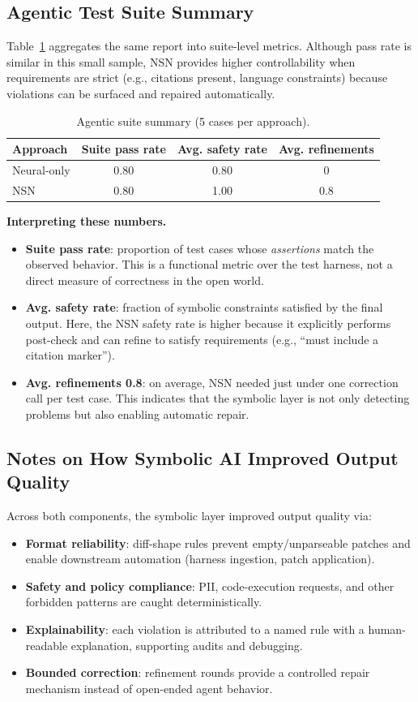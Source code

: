 \documentclass[conference]{IEEEtran}
\begin{document}
\subsection{Agentic Test Suite Summary}
Table~\ref{tab:agentic} aggregates the same report into suite-level metrics. Although pass rate is similar in this small sample, NSN provides higher controllability when requirements are strict (e.g., citations present, language constraints) because violations can be surfaced and repaired automatically.

\begin{table}[t]
\centering
\caption{Agentic suite summary (5 cases per approach).}
\label{tab:agentic}
\begin{tabular}{lccc}
\toprule
\textbf{Approach} & \textbf{Suite pass rate} & \textbf{Avg. safety rate} & \textbf{Avg. refinements} \\
\midrule
Neural-only & 0.80 & 0.80 & 0 \\
NSN & 0.80 & 1.00 & 0.8 \\
\bottomrule
\end{tabular}
\end{table}

\textbf{Interpreting these numbers.}
\begin{itemize}
  \item \textbf{Suite pass rate}: proportion of test cases whose \emph{assertions} match the observed behavior. This is a functional metric over the test harness, not a direct measure of correctness in the open world.
  \item \textbf{Avg. safety rate}: fraction of symbolic constraints satisfied by the final output. Here, the NSN safety rate is higher because it explicitly performs post-check and can refine to satisfy requirements (e.g., ``must include a citation marker'').
  \item \textbf{Avg. refinements 0.8}: on average, NSN needed just under one correction call per test case. This indicates that the symbolic layer is not only detecting problems but also enabling automatic repair.
\end{itemize}

\subsection{Notes on How Symbolic AI Improved Output Quality}
Across both components, the symbolic layer improved output quality via:
\begin{itemize}
  \item \textbf{Format reliability}: diff-shape rules prevent empty/unparseable patches and enable downstream automation (harness ingestion, patch application).
  \item \textbf{Safety and policy compliance}: PII, code-execution requests, and other forbidden patterns are caught deterministically.
  \item \textbf{Explainability}: each violation is attributed to a named rule with a human-readable explanation, supporting audits and debugging.
  \item \textbf{Bounded correction}: refinement rounds provide a controlled repair mechanism instead of open-ended agent behavior.
\end{itemize}
\end{document}
